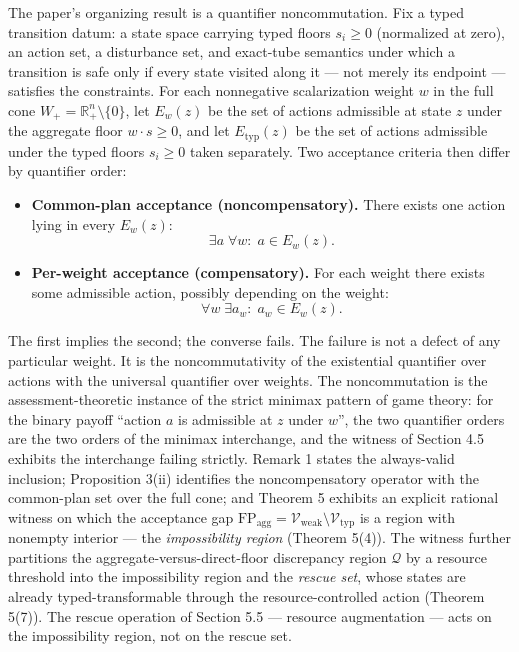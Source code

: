 \documentclass[11pt]{article}
\providecommand{\tightlist}{\setlength{\itemsep}{0pt}\setlength{\parskip}{0pt}}
\begin{document}
The paper's organizing result is a quantifier noncommutation. Fix a
typed transition datum: a state space carrying typed floors
\(s_i \ge 0\) (normalized at zero), an action set, a disturbance set,
and exact-tube semantics under which a transition is safe only if every
state visited along it --- not merely its endpoint --- satisfies the
constraints. For each nonnegative scalarization weight \(w\) in the full
cone \(W_+ = \mathbb{R}^n_+ \setminus \{0\}\), let \(E_w(z)\) be the set
of actions admissible at state \(z\) under the aggregate floor
\(w \cdot s \ge 0\), and let \(E_{\mathrm{typ}}(z)\) be the set of
actions admissible under the typed floors \(s_i \ge 0\) taken
separately. Two acceptance criteria then differ by quantifier order:

\begin{itemize}
\tightlist
\item
  \textbf{Common-plan acceptance (noncompensatory).} There exists one
  action lying in every \(E_w(z)\):
  \[\exists a\; \forall w:\; a \in E_w(z).\]
\item
  \textbf{Per-weight acceptance (compensatory).} For each weight there
  exists some admissible action, possibly depending on the weight:
  \[\forall w\; \exists a_w:\; a_w \in E_w(z).\]
\end{itemize}

The first implies the second; the converse fails. The failure is not a
defect of any particular weight. It is the noncommutativity of the
existential quantifier over actions with the universal quantifier over
weights. The noncommutation is the assessment-theoretic instance of the
strict minimax pattern of game theory: for the binary payoff ``action
\(a\) is admissible at \(z\) under \(w\)'', the two quantifier orders
are the two orders of the minimax interchange, and the witness of
Section 4.5 exhibits the interchange failing strictly. Remark 1 states the always-valid inclusion; Proposition 3(ii) identifies the noncompensatory operator with the common-plan set over the full cone; and Theorem 5 exhibits an explicit rational witness on which the acceptance gap
\(\mathrm{FP}_{\mathrm{agg}} = \mathcal{V}_{\mathrm{weak}} \setminus \mathcal{V}_{\mathrm{typ}}\)
is a region with nonempty interior --- the \emph{impossibility region}
(Theorem 5(4)). The witness further partitions the
aggregate-versus-direct-floor discrepancy region \(\mathcal{Q}\) by a
resource threshold into the impossibility region and the \emph{rescue
set}, whose states are already typed-transformable through the
resource-controlled action (Theorem 5(7)). The rescue operation of
Section 5.5 --- resource augmentation --- acts on the impossibility
region, not on the rescue set.
\end{document}
